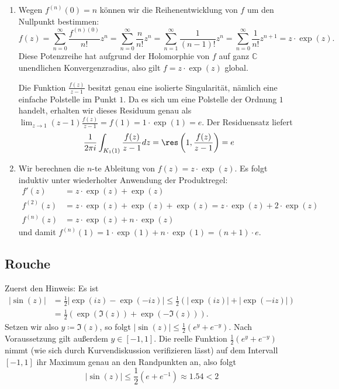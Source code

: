 \documentclass[a4paper]{article}
\begin{document}
\begin{enumerate}
	\item Wegen $f^{(n)}(0) = n$ können wir die Reihenentwicklung von $f$ um den Nullpunkt bestimmen:
	\begin{equation*}
		f(z) = \sum_{n = 0}^{\infty} \frac{f^{(n)(0)}}{n!} z^n = \sum_{n = 0}^{\infty} \frac{n}{n!} z^n = \sum_{n = 1}^{\infty} \frac{1}{(n-1)!} z^n = \sum_{n = 0}^{\infty} \frac{1}{n!} z^{n+1} = z \cdot \exp(z) \text{.}
	\end{equation*}
	Diese Potenzreihe hat aufgrund der Holomorphie von $f$ auf ganz $\mathds{C}$ unendlichen Konvergenzradius, also gilt $f = z \cdot \exp(z)$ global.

	Die Funktion $\frac{f(z)}{z - 1}$ besitzt genau eine isolierte Singularität, nämlich eine einfache Polstelle im Punkt $1$.
	Da es sich um eine Polstelle der Ordnung $1$ handelt, erhalten wir dieses Residuum genau als $\lim_{z \to 1} (z-1) \frac{f(z)}{z-1} = f(1) = 1 \cdot \exp(1) = e$.
	Der Residuensatz liefert
	\begin{equation*}
		\frac{1}{2 \pi i} \int_{K_1(1)} \frac{f(z)}{z-1} dz = \res\left( 1, \frac{f(z)}{z-1} \right) = e
	\end{equation*}
	\item Wir berechnen die $n$-te Ableitung von $f(z) = z \cdot \exp(z)$. Es folgt induktiv unter wiederholter Anwendung der Produktregel:
	\begin{align*}
		f'(z) &= z \cdot \exp(z) + \exp(z)\\
		f^{(2)}(z) &= z \cdot \exp(z) + \exp(z) + \exp(z) = z \cdot \exp(z) + 2 \cdot \exp(z)\\
		f^{(n)}(z) &= z \cdot \exp(z) + n \cdot \exp(z)
	\end{align*}
	und damit $f^{(n)}(1) = 1 \cdot \exp(1) + n \cdot \exp(1) = (n+1) \cdot e$.
\end{enumerate}

\subsection{Rouche}

Zuerst den Hinweis: Es ist
\begin{align*}
	|\sin(z)| &= \frac{1}{2} | \exp(iz) - \exp(-iz) | \leq \frac{1}{2} (|\exp(iz)| + |\exp(-iz)|)\\
	&= \frac{1}{2} (\exp(\Im(z)) + \exp(- \Im(z)))\text{.}
\end{align*}
Setzen wir also $y \coloneq \Im(z)$, so folgt $|\sin(z)| \leq \frac{1}{2} (e^y + e^{-y})$.
Nach Voraussetzung gilt außerdem $y \in [-1, 1]$.
Die reelle Funktion $\frac{1}{2} (e^y + e^{-y})$ nimmt (wie sich durch Kurvendiskussion verifizieren lässt) auf dem Intervall $[-1, 1]$ ihr Maximum genau an den Randpunkten an, also folgt
\begin{equation*}
	|\sin(z)| \leq \frac{1}{2}(e + e^{-1}) \approx 1.54 < 2
\end{equation*}
\end{document}
